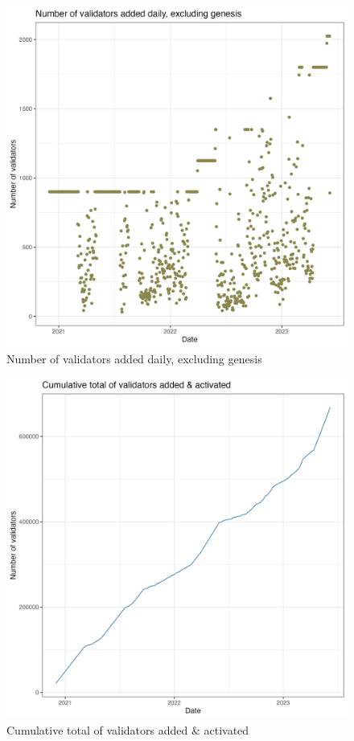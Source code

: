 \documentclass[UTF8]{article}
\begin{document}
\begin{figure}[htbp]
\begin{center}
\includegraphics[width=\linewidth]{images/daily_validator_plot_no_genesis_pt_no_smoothing_230607}             %
\caption{Number of validators added daily, excluding genesis}
\label{fig:dailyvalidator3}
\end{center}
\end{figure}

\begin{figure}[htbp]
\begin{center}
\includegraphics[width=\linewidth]{images/cumulative_validator_plot_230607}
\caption{Cumulative total of validators added \& activated}
\label{fig:cumulativevalidators}
\end{center}
\end{figure}
\end{document}
